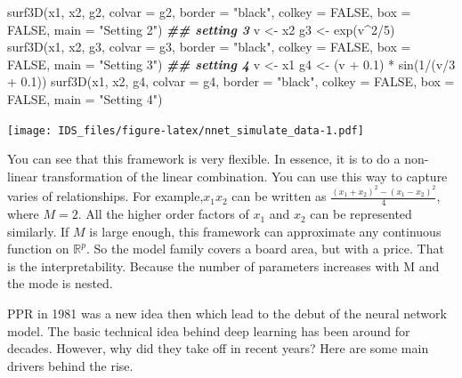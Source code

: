 \documentclass[
  12pt,
]{krantz}
\makeatletter
\newenvironment{Shaded}{\begin{snugshade}}{\end{snugshade}}
\newcommand{\AttributeTok}[1]{\textcolor[rgb]{0.61,0.61,0.61}{#1}}
\newcommand{\ConstantTok}[1]{\textcolor[rgb]{0,0,0}{#1}}
\newcommand{\DecValTok}[1]{\textcolor[rgb]{0.06,0.06,0.06}{#1}}
\newcommand{\DocumentationTok}[1]{\textcolor[rgb]{0.37,0.37,0.37}{\textbf{\textit{#1}}}}
\newcommand{\FloatTok}[1]{\textcolor[rgb]{0.06,0.06,0.06}{#1}}
\newcommand{\FunctionTok}[1]{\textcolor[rgb]{0,0,0}{#1}}
\newcommand{\NormalTok}[1]{#1}
\newcommand{\OtherTok}[1]{\textcolor[rgb]{0.37,0.37,0.37}{#1}}
\newcommand{\SpecialCharTok}[1]{\textcolor[rgb]{0,0,0}{#1}}
\newcommand{\StringTok}[1]{\textcolor[rgb]{0.5,0.5,0.5}{#1}}
\newenvironment{kframe}{%
\medskip{}
\setlength{\fboxsep}{.8em}
 \def\at@end@of@kframe{}%
 \ifinner\ifhmode%
  \def\at@end@of@kframe{\end{minipage}}%
  \begin{minipage}{\columnwidth}%
 \fi\fi%
 \def\FrameCommand##1{\hskip\@totalleftmargin \hskip-\fboxsep
 \colorbox{shadecolor}{##1}\hskip-\fboxsep
     \hskip-\linewidth \hskip-\@totalleftmargin \hskip\columnwidth}%
 \MakeFramed {\advance\hsize-\width
   \@totalleftmargin\z@ \linewidth\hsize
   \@setminipage}}%
 {\par\unskip\endMakeFramed%
 \at@end@of@kframe}
\renewenvironment{Shaded}{\begin{kframe}}{\end{kframe}}
\makeatother
\begin{document}
\begin{Shaded}
\begin{Highlighting}[]
\FunctionTok{surf3D}\NormalTok{(x1, x2, g2, }\AttributeTok{colvar =}\NormalTok{ g2, }\AttributeTok{border =} \StringTok{"black"}\NormalTok{, }\AttributeTok{colkey =} \ConstantTok{FALSE}\NormalTok{, }
    \AttributeTok{box =} \ConstantTok{FALSE}\NormalTok{, }\AttributeTok{main =} \StringTok{"Setting 2"}\NormalTok{)}
\DocumentationTok{\#\# setting 3}
\NormalTok{v }\OtherTok{\textless{}{-}}\NormalTok{ x2}
\NormalTok{g3 }\OtherTok{\textless{}{-}} \FunctionTok{exp}\NormalTok{(v}\SpecialCharTok{\^{}}\DecValTok{2}\SpecialCharTok{/}\DecValTok{5}\NormalTok{)}
\FunctionTok{surf3D}\NormalTok{(x1, x2, g3, }\AttributeTok{colvar =}\NormalTok{ g3, }\AttributeTok{border =} \StringTok{"black"}\NormalTok{, }\AttributeTok{colkey =} \ConstantTok{FALSE}\NormalTok{, }
    \AttributeTok{box =} \ConstantTok{FALSE}\NormalTok{, }\AttributeTok{main =} \StringTok{"Setting 3"}\NormalTok{)}
\DocumentationTok{\#\# setting 4}
\NormalTok{v }\OtherTok{\textless{}{-}}\NormalTok{ x1}
\NormalTok{g4 }\OtherTok{\textless{}{-}}\NormalTok{ (v }\SpecialCharTok{+} \FloatTok{0.1}\NormalTok{) }\SpecialCharTok{*} \FunctionTok{sin}\NormalTok{(}\DecValTok{1}\SpecialCharTok{/}\NormalTok{(v}\SpecialCharTok{/}\DecValTok{3} \SpecialCharTok{+} \FloatTok{0.1}\NormalTok{))}
\FunctionTok{surf3D}\NormalTok{(x1, x2, g4, }\AttributeTok{colvar =}\NormalTok{ g4, }\AttributeTok{border =} \StringTok{"black"}\NormalTok{, }\AttributeTok{colkey =} \ConstantTok{FALSE}\NormalTok{, }
    \AttributeTok{box =} \ConstantTok{FALSE}\NormalTok{, }\AttributeTok{main =} \StringTok{"Setting 4"}\NormalTok{)}
\end{Highlighting}
\end{Shaded}

\texttt{[image: IDS\_files/figure-latex/nnet\_simulate\_data-1.pdf]}

You can see that this framework is very flexible. In essence, it is to do a non-linear transformation of the linear combination. You can use this way to capture varies of relationships. For example,\(x_{1}x_{2}\) can be written as \(\frac{(x_{1}+x_{2})^{2}-(x_{1}-x_{2})^{2}}{4}\), where \(M=2\). All the higher order factors of \(x_1\) and \(x_2\) can be represented similarly. If \(M\) is large enough, this framework can approximate any continuous function on \(\mathbb{R}^{p}\). So the model family covers a board area, but with a price. That is the interpretability. Because the number of parameters increases with M and the mode is nested.

PPR in 1981 was a new idea then which lead to the debut of the neural network model. The basic technical idea behind deep learning has been around for decades. However, why did they take off in recent years? Here are some main drivers behind the rise.
\end{document}
